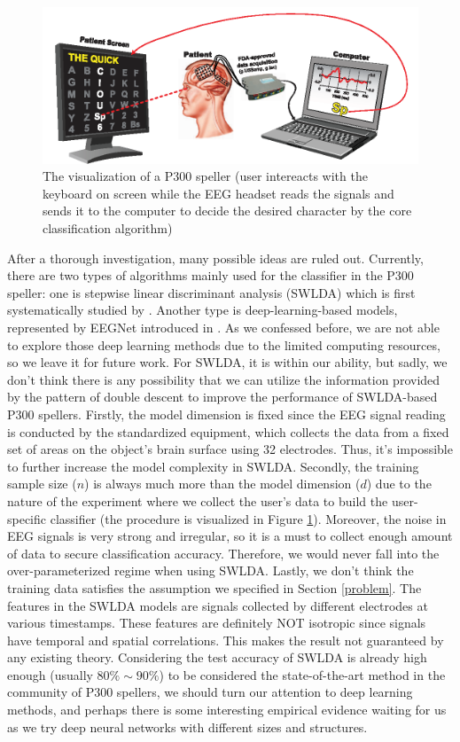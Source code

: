 \documentclass{article}
\begin{document}
\vspace{-5mm}
\begin{figure}[H]
	\centering
	\includegraphics[width=0.6\linewidth]{p300_speller.png}
	\caption{The visualization of a P300 speller (user intereacts with the keyboard on screen while the EEG headset reads the signals and sends it to the computer to decide the desired character by the core classification algorithm)}
	\label{fig:3}
\end{figure}

\vspace{-3mm}
After a thorough investigation, many possible ideas are ruled out. Currently, there are two types of algorithms mainly used for the classifier in the P300 speller: one is stepwise linear discriminant analysis (SWLDA) which is first systematically studied by \cite{krusienski2006comparison}. Another type is deep-learning-based models, represented by EEGNet introduced in \cite{lawhern2018eegnet}. As we confessed before, we are not able to explore those deep learning methods due to the limited computing resources, so we leave it for future work. For SWLDA, it is within our ability, but sadly, we don't think there is any possibility that we can utilize the information provided by the pattern of double descent to improve the performance of SWLDA-based P300 spellers. Firstly, the model dimension is fixed since the EEG signal reading is conducted by the standardized equipment, which collects the data from a fixed set of areas on the object's brain surface using 32 electrodes. Thus, it's impossible to further increase the model complexity in SWLDA. Secondly, the training sample size ($n$) is always much more than the model dimension ($d$) due to the nature of the experiment where we collect the user's data to build the user-specific classifier (the procedure is visualized in Figure \ref{fig:3}). Moreover, the noise in EEG signals is very strong and irregular, so it is a must to collect enough amount of data to secure classification accuracy. Therefore, we would never fall into the over-parameterized regime when using SWLDA. Lastly, we don't think the training data satisfies the assumption we specified in Section \ref{problem}. The features in the SWLDA models are signals collected by different electrodes at various timestamps. These features are definitely NOT isotropic since signals have temporal and spatial correlations. This makes the result not guaranteed by any existing theory. Considering the test accuracy of SWLDA is already high enough (usually $80\% \sim 90\%$) to be considered the state-of-the-art method in the community of P300 spellers, we should turn our attention to deep learning methods, and perhaps there is some interesting empirical evidence waiting for us as we try deep neural networks with different sizes and structures.
\end{document}
